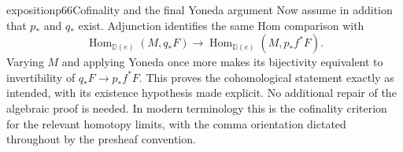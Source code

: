 \begin{dcomment}{exposition}{p66}{Cofinality and the final Yoneda argument}
Now assume in addition that $p_*$ and $q_*$ exist. Adjunction identifies the same Hom comparison with
\[
 \operatorname{Hom}_{\mathbb D(e)}(M,q_*F)
 \longrightarrow
 \operatorname{Hom}_{\mathbb D(e)}(M,p_*f^*F).
\]
Varying $M$ and applying Yoneda once more makes its bijectivity equivalent to invertibility of $q_*F\to p_*f^*F$. This proves the cohomological statement exactly as intended, with its existence hypothesis made explicit. No additional repair of the algebraic proof is needed. In modern terminology this is the cofinality criterion for the relevant homotopy limits, with the comma orientation dictated throughout by the presheaf convention.
\end{dcomment}
